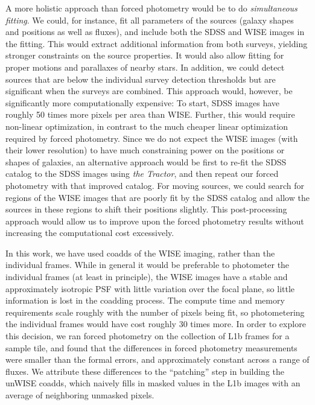 \documentclass[12pt,preprint]{aastex}
\newcommand{\thetractor}{\textsl{the Tractor}}
\begin{document}
A more holistic approach than forced photometry would be to do
\emph{simultaneous fitting}.  We could, for instance, fit all
parameters of the sources (galaxy shapes and positions as well as
fluxes), and include both the SDSS and WISE images in the fitting.
This would extract additional information from both surveys, yielding
stronger constraints on the source properties.  It would also allow
fitting for proper motions and parallaxes of nearby stars.  In
addition, we could detect sources that are below the individual survey
detection thresholds but are significant when the surveys are
combined.  This approach would, however, be significantly more
computationally expensive: To start, SDSS images have roughly 50 times
more pixels per area than WISE.  Further, this would require
non-linear optimization, in contrast to the much cheaper linear
optimization required by forced photometry.  Since we do not expect
the WISE images (with their lower resolution) to have much
constraining power on the positions or shapes of galaxies, an
alternative approach would be first to re-fit the SDSS catalog to the
SDSS images using \thetractor, and then repeat our forced photometry
with that improved catalog.  For moving sources, we could search for
regions of the WISE images that are poorly fit by the SDSS catalog and
allow the sources in these regions to shift their positions slightly.
This post-processing approach would allow us to improve upon the
forced photometry results without increasing the computational cost
excessively.


In this work, we have used coadds of the WISE imaging, rather than the
individual frames.  While in general it would be preferable to
photometer the individual frames (at least in principle), the WISE
images have a stable and approximately isotropic PSF with little
variation over the focal plane, so little information is lost in the
coadding process.  The compute time and memory requirements
scale roughly with the number of pixels being fit, so photometering
the individual frames would have cost roughly 30 times more.
%
In order to explore this decision, we ran forced photometry on the
collection of L1b frames for a sample tile, and found that the
differences in forced photometry measurements were smaller than the
formal errors, and approximately constant across a range of fluxes.
We attribute these differences to the ``patching'' step in building
the unWISE coadds, which naively fills in masked values in the L1b
images with an average of neighboring unmasked pixels.
\end{document}
